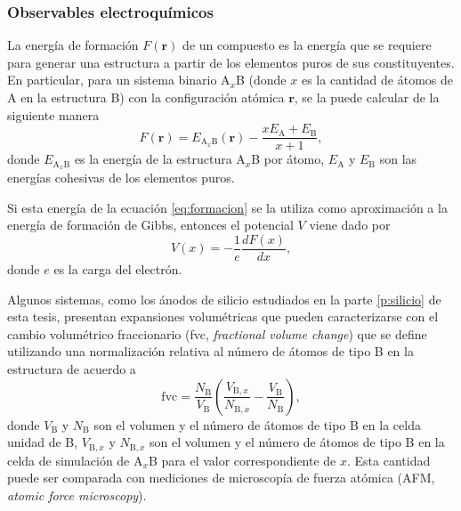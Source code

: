 % 

\subsubsection{Observables electroquímicos}\label{ss:electrochim}

La energía de formación $F(\mathbf{r})$ de un compuesto es la energía que se requiere para generar 
una estructura a partir de los elementos puros de sus constituyentes. En particular, para un sistema binario A$_x$B (donde $x$ es la 
cantidad de átomos de A en la estructura B) con la configuración atómica
$\mathbf{r}$, se la puede calcular de la siguiente manera
\begin{equation}\label{eq:formacion}
    F(\mathbf{r}) = E_{\text{A}_x\text{B}}(\mathbf{r}) - \frac{x E_{\text{A}} + E_{\text{B}}}{x + 1},
\end{equation}
donde $E_{\text{A}_x\text{B}}$ es la energía de la estructura A$_x$B por átomo, 
$E_{\text{A}}$ y $E_{\text{B}}$ son las energías cohesivas de los elementos puros.

Si esta energía de la ecuación \ref{eq:formacion} se la utiliza como aproximación 
a la energía de formación de Gibbs, entonces el potencial $V$ viene dado por \cite{urban2016, aydinol1997}
\begin{equation}\label{eq:potencial}
    V(x) = - \frac{1}{e} \frac{d F(x)}{dx},
\end{equation}
donde $e$ es la carga del electrón.

Algunos sistemas, como los ánodos de silicio estudiados en la parte 
\ref{p:silicio} de esta tesis, presentan expansiones volumétricas que pueden 
caracterizarse con el cambio volumétrico fraccionario (fvc, \textit{fractional 
volume change}) que se define utilizando una normalización relativa al número de
átomos de tipo B en la estructura de acuerdo a 
\begin{equation}\label{eq:fvc}
    \text{fvc} = \frac{N_{\text{B}}}{V_{\text{B}}} \left( \frac{V_{\text{B},x}}{N_{\text{B},x}} - \frac{V_{\text{B}}}{N_{\text{B}}} \right),
\end{equation}
donde $V_{\text{B}}$ y $N_{\text{B}}$ son el volumen y el número de átomos de 
tipo B en la celda unidad de B, $V_{\text{B},x}$ y $N_{\text{B},x}$ son el 
volumen y el número de átomos de tipo B en la celda de simulación de A$_x$B para
el valor correspondiente de $x$. Esta cantidad puede ser comparada con mediciones
de microscopía de fuerza atómica (AFM, \textit{atomic force microscopy}).
